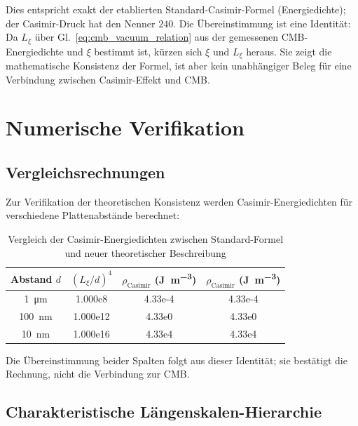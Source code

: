 	
	
	Dies entspricht exakt der etablierten Standard-Casimir-Formel (Energiedichte); der Casimir-Druck hat den Nenner $240$. Die Übereinstimmung ist eine Identität: Da \( L_\xi \) über Gl.~\eqref{eq:cmb_vacuum_relation} aus der gemessenen CMB-Energiedichte und \( \xi \) bestimmt ist, kürzen sich \( \xi \) und \( L_\xi \) heraus. Sie zeigt die mathematische Konsistenz der Formel, ist aber kein unabhängiger Beleg für eine Verbindung zwischen Casimir-Effekt und CMB.
	
	\section{Numerische Verifikation}
	
	\subsection{Vergleichsrechnungen}
	
	Zur Verifikation der theoretischen Konsistenz werden Casimir-Energiedichten für verschiedene Plattenabstände berechnet:
	
	\begin{table}[H]
		\centering
		\begin{tabular}{c S[table-format=1.3e1] S[table-format=1.2e-2] S[table-format=1.2e-2]}
			\toprule
			Abstand \( d \) & {\((L_\xi/d)^4\)} & {\(\rho_{\text{Casimir}}\) (\unit{\joule\per\meter\cubed})} & {\(\rho_{\text{Casimir}}\) (\unit{\joule\per\meter\cubed})} \\
			\midrule
			\SI{1}{\micro\meter} & 1.000e8 & 4.33e-4 & 4.33e-4 \\
			\SI{100}{\nano\meter} & 1.000e12 & 4.33e0 & 4.33e0 \\
			\SI{10}{\nano\meter} & 1.000e16 & 4.33e4 & 4.33e4 \\
			\bottomrule
		\end{tabular}
		\caption{Vergleich der Casimir-Energiedichten zwischen Standard-Formel und neuer theoretischer Beschreibung}
		\label{tab:casimir_comparison}
	\end{table}
	
	Die Übereinstimmung beider Spalten folgt aus dieser Identität; sie bestätigt die Rechnung, nicht die Verbindung zur CMB.
	
	\subsection{Charakteristische Längenskalen-Hierarchie}
	
